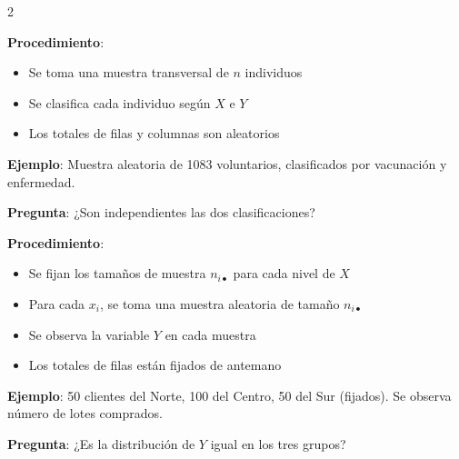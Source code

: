 \documentclass[10pt,a4paper]{article}
\begin{document}
\begin{multicols}{2}
    \begin{tcolorbox}[title=Diseño Experimental: Independencia, equal height group=IH2]
        \textbf{Procedimiento}:
        \begin{itemize}
            \item Se toma una muestra transversal de $n$ individuos
            \item Se clasifica cada individuo según $X$ e $Y$
            \item Los totales de filas y columnas son aleatorios
        \end{itemize}
        
        \textbf{Ejemplo}: Muestra aleatoria de 1083 voluntarios, clasificados por vacunación y enfermedad.
        
        \textbf{Pregunta}: ¿Son independientes las dos clasificaciones?
    \end{tcolorbox}
    \begin{tcolorbox}[title=Diseño Experimental: Homogeneidad, equal height group=IH2]
        \textbf{Procedimiento}:
        \begin{itemize}
            \item Se fijan los tamaños de muestra $n_{i \bullet}$ para cada nivel de $X$
            \item Para cada $x_i$, se toma una muestra aleatoria de tamaño $n_{i \bullet}$
            \item Se observa la variable $Y$ en cada muestra
            \item Los totales de filas están fijados de antemano
        \end{itemize}
        
        \textbf{Ejemplo}: 50 clientes del Norte, 100 del Centro, 50 del Sur (fijados). Se observa número de lotes comprados.
        
        \textbf{Pregunta}: ¿Es la distribución de $Y$ igual en los tres grupos?
    \end{tcolorbox}
\end{multicols}
\end{document}
